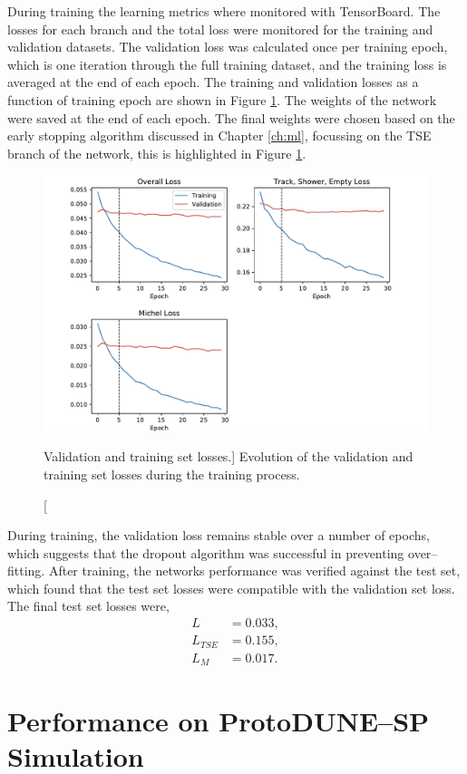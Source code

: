 During training the learning metrics where monitored with TensorBoard. The
losses for each branch and the total loss were monitored for the training
and validation datasets. The validation loss was calculated once per training
epoch, which is one iteration through the full training dataset, and the
training loss is averaged at the end of each epoch. The training and validation
losses as a function of training epoch are shown in Figure \ref{fig:training}.
The weights of the network were saved at the end of each epoch. The final
weights were chosen based on the early stopping algorithm discussed in Chapter
\ref{ch:ml}, focussing on the TSE branch of the network, this is highlighted 
in Figure \ref{fig:training}.
\begin{figure}
	\centering
	\includegraphics[width=\textwidth]{figures/losses_prelu.pdf}
	\caption
	[Validation and training set losses.]
	{Evolution of the validation and training set losses during the training 
	process.} 
	\label{fig:training}
\end{figure}

During training, the validation loss remains stable over a number of epochs,
which suggests that the dropout algorithm was successful in preventing 
over--fitting. After training, the networks performance was verified against 
the test set, which found that the test set losses were compatible with the 
validation set loss. The final test set losses were, 
\begin{align*}
	L &       = 0.033, \\
	L_{TSE} & = 0.155, \\
	L_M &     = 0.017.
\end{align*}

\section{Performance on ProtoDUNE--SP Simulation} \label{cnn-perf-sim}

